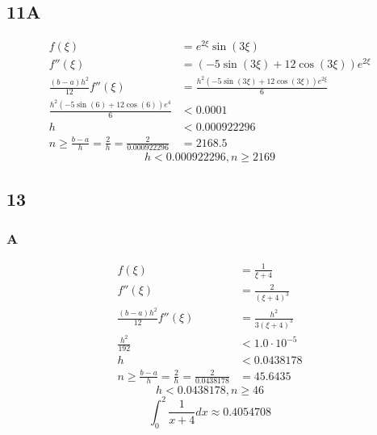 \documentclass{oisinclass}
\begin{document}
\subsection*{11A}
\begin{align*}
	f(\xi)                                                                                  & = e^{2 \xi} \sin{\left(3 \xi \right)}                                                                 \\
	f''(\xi)                                                                                & = \left(- 5 \sin{\left(3 \xi \right)} + 12 \cos{\left(3 \xi \right)}\right) e^{2 \xi}                 \\
	\frac{(b-a)h^2}{12}f''(\xi)                                                             & = \frac{h^{2} \left(- 5 \sin{\left(3 \xi \right)} + 12 \cos{\left(3 \xi \right)}\right) e^{2 \xi}}{6} \\
	\frac{h^{2} \left(- 5 \sin{\left(6 \right)} + 12 \cos{\left(6 \right)}\right) e^{4}}{6} & < 0.0001                                                                                              \\
	h                                                                                       & < 0.000922296                                                                                         \\
	n \geq \frac{b - a}{h} = \frac{2}{h} = \frac{2}{0.000922296}                            & = 2168.5
\end{align*}
\[
	h < 0.000922296, n \geq 2169
\]

\subsection*{13}
\subsubsection*{A}
\begin{align*}
	f(\xi)                                                     & = \frac{1}{\xi + 4}                        \\
	f''(\xi)                                                   & = \frac{2}{\left(\xi + 4\right)^{3}}       \\
	\frac{(b-a)h^2}{12}f''(\xi)                                & = \frac{h^{2}}{3 \left(\xi + 4\right)^{3}} \\
	\frac{h^{2}}{192}                                          & < 1.0 \cdot 10^{-5}                        \\
	h                                                          & < 0.0438178                                \\
	n \geq \frac{b - a}{h} = \frac{2}{h} = \frac{2}{0.0438178} & = 45.6435
\end{align*}
\[
	h < 0.0438178, n \geq 46
\]
\[
	\int_{0}^{2}\frac{1}{x+4}dx \approx 0.4054708
\]
\end{document}
